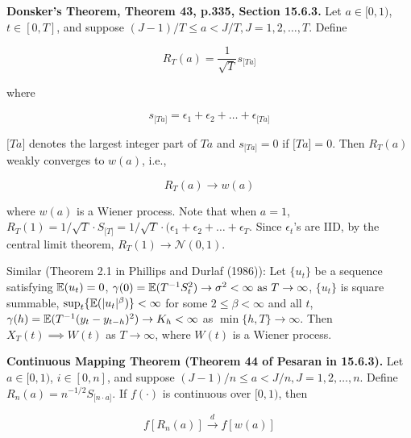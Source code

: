 \begin{theorem}\label{stoch.donsker}\textbf{Donsker's Theorem, Theorem 43, p.335, Section 15.6.3.} Let \(a \in [0, 1)\), \(t \in [0, T]\), and suppose \((J - 1)/T \leq a < J/T, J = 1, 2, \ldots, T\). Define

\[
R_T(a) = \frac{1}{\sqrt{T}} s_{ \big[Ta \big] }
\]

where

\[
s_{ \big[Ta \big] } = \epsilon_1 + \epsilon_2 + \ldots + \epsilon_{ \big[Ta \big] }
\]

\(\big[Ta \big]\) denotes the largest integer part of \(Ta\) and \(s_{ \big[Ta \big] } = 0\) if \(\big[Ta \big] = 0\). Then \(R_T(a)\) weakly converges to \(w(a)\), i.e., 

\[
R_T(a) \to w(a)
\]

where \(w(a)\) is a Wiener process. Note that when \(a = 1\), \(R_T(1) = 1/\sqrt{T} \cdot S_{\big[T \big]} = 1/\sqrt{T} \cdot (\epsilon_1 + \epsilon_2 + \ldots + \epsilon_T\). Since \(\epsilon_t\)'s are IID, by the central limit theorem, \(R_T(1) \to \mathcal{N}(0, 1)\). 

\end{theorem}

Similar (Theorem 2.1 in  Phillips and Durlaf (1986)): Let \(\{u_t\}\) be a sequence satisfying \(\E(u_t) = 0\), \( \gamma(0) = \E(T^{-1}S_t ^2) \to \sigma^2 < \infty \text{ as } T \to \infty\), \(\{u_t\}\) is square summable, \(\sup_t \{ \E( |u_t|^\beta) \} < \infty\) for some \(2 \leq \beta < \infty\) and all \(t\), \(\gamma(h) = \E(T^{-1}(y_t - y_{t-h})^2) \to K_h < \infty\) as \(\min \{h, T\} \to \infty\). Then \(X_T(t) \implies W(t)\) as \(T \to \infty\), where \(W(t)\) is a Wiener process.

\begin{theorem}\label{stoch.cont.map} \textbf{Continuous Mapping Theorem (Theorem 44 of Pesaran in 15.6.3).} Let \(a \in [0, 1)\), \(i \in [0, n]\), and suppose \((J-1)/n \leq a < J/n, J = 1, 2, \ldots, n\). Define \(R_n(a) = n^{-1/2} S_{\big[ n \cdot a \big] }\). If \(f(\cdot)\) is continuous over \([0, 1)\), then 

\[
f[R_n(a)] \xrightarrow{d} f[w(a)]
\]

\end{theorem}


%
%
%
%
%
%
%
%
%
%

%





